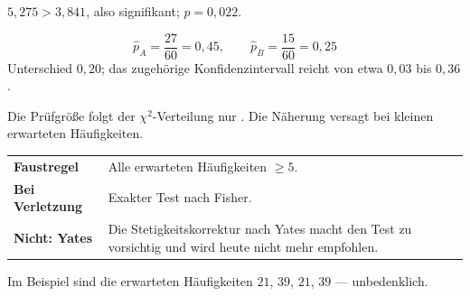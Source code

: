 \begin{merksatz}
$5{,}275 > 3{,}841$, also signifikant; $p = 0{,}022$.

\[ \hat p_A = \frac{27}{60} = 0{,}45, \qquad \hat p_B = \frac{15}{60} = 0{,}25 \]
Unterschied $0{,}20$; das zugehörige Konfidenzintervall reicht von etwa $0{,}03$ bis $0{,}36$.

\begin{center}
\begin{minipage}{0.88\textwidth}
\end{minipage}
\end{center}
\end{merksatz}

\begin{warnung}
Die Prüfgröße folgt der $\chi^2$-Verteilung nur . Die Näherung versagt bei kleinen erwarteten Häufigkeiten.

\begin{center}
\renewcommand{\arraystretch}{1.5}
\begin{tabular}{@{}P{2.6cm}P{6.0cm}@{}}
\toprule
\textbf{Faustregel} & Alle erwarteten Häufigkeiten $\ge 5$.\\
\textbf{Bei Verletzung} & Exakter Test nach Fisher.\\
\textbf{Nicht: Yates} & Die Stetigkeitskorrektur nach Yates macht den Test zu vorsichtig und wird heute nicht mehr empfohlen.\\
\bottomrule
\end{tabular}
\end{center}

Im Beispiel sind die erwarteten Häufigkeiten $21$, $39$, $21$, $39$ --- unbedenklich.
\end{warnung}

